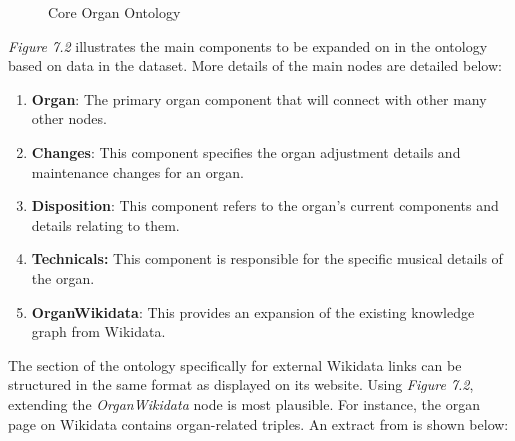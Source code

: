 \begin{figure}[H]
    \begin{center}
    \end{center}
    \vspace{-0.4cm}
\caption{Core Organ Ontology}
\end{figure}
\vspace{-0.1cm}

\textit{Figure 7.2} illustrates the main components to be expanded on in the ontology based on data in the dataset. More details of the main nodes are detailed below:

\begin{enumerate}
    \item \textbf{Organ}: The primary organ component that will connect with other many other nodes.
    \item \textbf{Changes}: This component specifies the organ adjustment details and maintenance changes for an organ.
    \item \textbf{Disposition}: This component refers to the organ's current components and details relating to them.
    \item \textbf{Technicals:} This component is responsible for the specific musical details of the organ. 
    \item \textbf{OrganWikidata}: This provides an expansion of the existing knowledge graph from Wikidata.
\end{enumerate}

The section of the ontology specifically for external Wikidata links can be structured in the same format as displayed on its website. Using \textit{Figure 7.2}, extending the \textit{OrganWikidata} node is most plausible. For instance, the organ page on Wikidata \cite{organwikidata} contains organ-related triples. An extract from \cite{organwikidata} is shown below:

